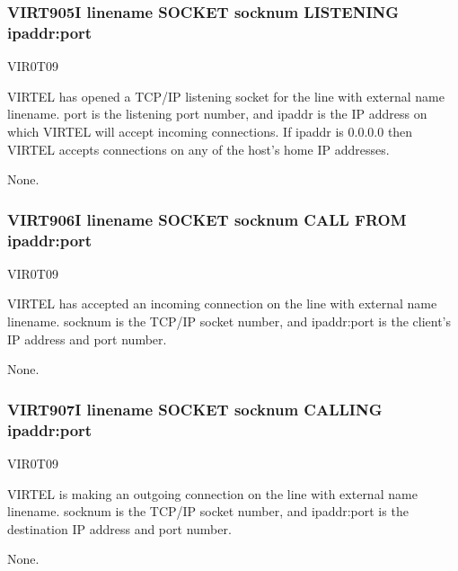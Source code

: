 \documentclass[letterpaper,10pt,english]{sphinxmanual}
\begin{document}
\subsubsection{VIRT905I linename SOCKET socknum LISTENING ipaddr:port}
\label{\detokenize{messages:virt905i-linename-socket-socknum-listening-ipaddr-port}}\begin{description}
\sphinxAtStartPar
VIR0T09

\sphinxAtStartPar
VIRTEL has opened a TCP/IP listening socket for the line with external name linename. port is the listening port number, and ipaddr is the IP address on which VIRTEL will accept incoming connections. If ipaddr is 0.0.0.0 then VIRTEL accepts connections on any of the host’s home IP addresses.

\sphinxAtStartPar
None.

\end{description}


\subsubsection{VIRT906I linename SOCKET socknum CALL FROM ipaddr:port}
\label{\detokenize{messages:virt906i-linename-socket-socknum-call-from-ipaddr-port}}\begin{description}
\sphinxAtStartPar
VIR0T09

\sphinxAtStartPar
VIRTEL has accepted an incoming connection on the line with external name linename. socknum is the TCP/IP socket number, and ipaddr:port is the client’s IP address and port number.

\sphinxAtStartPar
None.

\end{description}


\subsubsection{VIRT907I linename SOCKET socknum CALLING ipaddr:port}
\label{\detokenize{messages:virt907i-linename-socket-socknum-calling-ipaddr-port}}\begin{description}
\sphinxAtStartPar
VIR0T09

\sphinxAtStartPar
VIRTEL is making an outgoing connection on the line with external name linename. socknum is the TCP/IP socket number, and ipaddr:port is the destination IP address and port number.

\sphinxAtStartPar
None.

\end{description}
\end{document}
